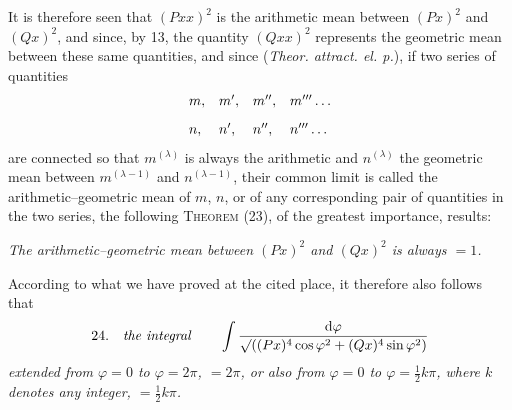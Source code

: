 It is therefore seen that $(Pxx)^2$ is the arithmetic mean between $(Px)^2$ and $(Qx)^2$, and since, by 13, the quantity $(Qxx)^2$ represents the geometric mean between these same quantities, and since (\textit{Theor. attract. el. p.}), if two series of quantities
\[
\begin{array}{llll}
m,&m',&m'',&m'''\mathinner{.\,.\,.}\\[8pt]
n,&n',&n'',&n'''\mathinner{.\,.\,.}
\end{array}
\]
are connected so that $m^{(\lambda)}$ is always the arithmetic and $n^{(\lambda)}$ the geometric mean between $m^{(\lambda-1)}$ and $n^{(\lambda-1)}$, their common limit is called the arithmetic–geometric mean of $m$, $n$, or of any corresponding pair of quantities in the two series, the following \textsc{Theorem} (23), of the greatest importance, results:

\textit{The arithmetic–geometric mean between $(Px)^2$ and $(Qx)^2$ is always $=1$.}


According to what we have proved at the cited place, it therefore also follows that
\[
24.\quad\text{\textit{the integral}}\qquad
\int\frac{\mathrm{d}\varphi}{\mathord{\surd}{((Px)^4\cos\varphi^2+(Qx)^4\sin\varphi^2)}}
\]
\textit{extended from $\varphi=0$ to $\varphi=2\pi$, $=2\pi$, or also from $\varphi=0$ to $\varphi=\tfrac12k\pi$, where $k$ denotes any integer, $=\tfrac12k\pi$.}

\clearpage
\endgroup
